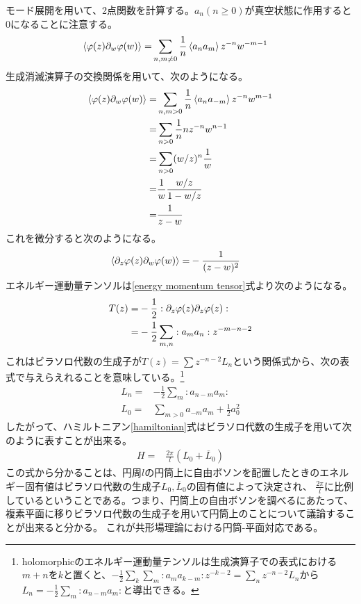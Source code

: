 \documentclass[11pt, dvipdfmx]{article}
\numberwithin{equation}{section}
\newcommand{\blankline}{\par\vspace{\baselineskip}} %
\begin{document}
モード展開を用いて、2点関数を計算する。$a_n(n\geq0)$が真空状態に作用すると0になることに注意する。%
\begin{align}
    \ev{\varphi(z)\partial_w\varphi(w)}=& \sum_{n,m\neq 0}\frac{1}{n}\ev{a_n a_m} z^{-n} w^{-m-1}
    \end{align}
生成消滅演算子の交換関係を用いて、次のようになる。
\begin{align}
    \ev{\varphi(z)\partial_w\varphi(w)}=& \sum_{n,m>0}\frac{1}{n} \ev{a_{n}a_{-m}} z^{-n} w^{m-1}\notag\\
    =&\sum_{n>0}\frac{1}{n} n z^{-n} w^{n-1}\notag\\
    =& \sum_{n>0} (w/z)^{n} \frac{1}{w}\notag\\
    =& \frac{1}{w}\frac{w/z}{1 - w/z}\notag\\
    =& \frac{1}{z-w}
\end{align}
これを微分すると次のようになる。
\begin{align}
    \ev{\partial_z \varphi(z)\partial_w\varphi(w)}=& -\frac{1}{(z-w)^2}
\end{align}
エネルギー運動量テンソルは\eqref{energy momentum tensor}式より次のようになる。
\begin{align}
    T(z)=&- \frac{1}{2}:\partial_z \varphi(z)\partial_z \varphi(z):\notag\\
    =& -\frac{1}{2}\sum_{m,n}:a_m a_n: z^{-m-n-2}
\end{align}
これはビラソロ代数の生成子が$T(z)=\sum z^{-n-2}L_n$という関係式から、次の表式で与えらえれることを意味している。\footnote{
    holomorphicのエネルギー運動量テンソルは生成演算子での表式における$m+n$を$k$と置くと、$-\frac{1}{2}\sum_{k}\sum_{m}:a_m a_{k-m}: z^{-k-2}=\sum_{n} z^{-n-2}L_n$から$L_n= -\frac{1}{2}\sum_{m}:a_{n-m} a_m:$と導出できる。
}
\begin{align}
L_n=& -\frac{1}{2}\sum_{m}:a_{n-m} a_m:\\
L_0=& \sum_{m>0} a_{-m} a_m + \frac{1}{2} a_0^2
\end{align}
したがって、ハミルトニアン\eqref{hamiltonian}式はビラソロ代数の生成子を用いて次のように表すことが出来る。
\begin{align}
    H=&\frac{2\pi}{l}(L_0 + \overline{L}_0)
\end{align}
この式から分かることは、円周$l$の円筒上に自由ボソンを配置したときのエネルギー固有値はビラソロ代数の生成子$L_0,\overline{L}_0$の固有値によって決定され、
$\frac{2\pi}{l}$に比例しているということである。つまり、円筒上の自由ボソンを調べるにあたって、複素平面に移りビラソロ代数の生成子を用いて円筒上のことについて議論することが出来ると分かる。
これが共形場理論における円筒-平面対応である。
\blankline
\end{document}
